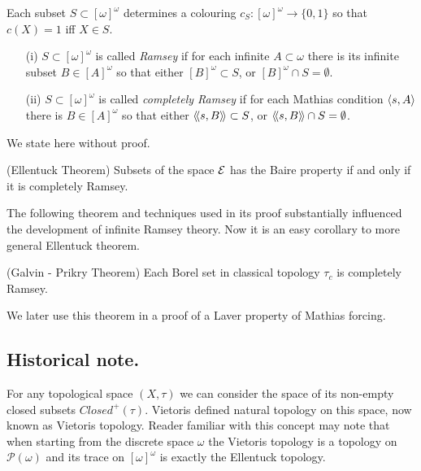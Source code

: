 Each subset $S \subset [\omega]^\omega$ determines a colouring
$c_S:[\omega]^\omega \rightarrow \{0,1\}$ so that $c(X)=1$
iff $X \in S$.

\begin{definition}
 \begin{itemize}
  \item[(i)] $S \subset [\omega]^\omega$ is called \emph{Ramsey}
	if for each infinite $A \subset \omega$ there is its
	infinite subset $B \in [A]^\omega$ so that
	either $[B]^\omega \subset S$, or $[B]^\omega \cap S = \emptyset$.
  \item[(ii)]  $S \subset [\omega]^\omega$ is called \emph{completely Ramsey}
	if for each Mathias condition $\langle s,A\rangle$ there is $B \in [A]^\omega$
	so that either $\langle\!\langle s,B \rangle\!\rangle \subset S$, or $\langle\!\langle s,B \rangle\!\rangle \cap S = \emptyset$.
 \end{itemize}
\end{definition}

We state here without proof.

\begin{theorem}\label{ellentuck}{\rm (Ellentuck Theorem)}
Subsets of the space $\mathcal E$ has the Baire property if and only if
it is completely Ramsey.
\end{theorem}

The following theorem and techniques used in its proof substantially influenced the
development of infinite Ramsey theory. Now it is an easy corollary
to more general Ellentuck theorem.

\begin{theorem}\label{galvin-prikry}{\rm (Galvin - Prikry Theorem)}
Each Borel set in classical topology $\tau_c$ is completely Ramsey.
\end{theorem}

We later use this theorem in a proof of a Laver property of Mathias forcing.

\subsection{${}$Historical note.}
For any topological space $(X,\tau)$ we can consider the space
of its non-empty closed subsets $Closed^+(\tau)$. Vietoris defined
natural topology on this space, now known as Vietoris topology.
Reader familiar with this concept may note that when starting
from the discrete space $\omega$ the Vietoris topology is a topology
on $\mathcal P(\omega)$ and its trace on $[\omega]^\omega$ is
exactly the Ellentuck topology.


